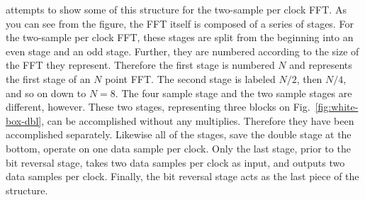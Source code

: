 \documentclass{gqtekspec}
\begin{document}
attempts to show some of this structure for the two-sample per clock FFT.
As you can see from the figure, the
FFT itself is composed of a series of stages.  For the two-sample per clock
FFT, these stages are split from the beginning into an even stage and an odd
stage.  Further, they are numbered
according to the size of the FFT they represent.  Therefore the first stage
is numbered $N$ and represents the first stage of an $N$ point FFT.  The
second stage is labeled $N/2$, then $N/4$, and so on down to $N=8$.  The
four sample stage and the two sample stages are different, however.  These
two stages, representing three blocks on Fig.~\ref{fig:white-box-dbl}, can be
accomplished without any multiplies.  Therefore they have been accomplished
separately.  Likewise all of the stages, save the double stage at the bottom,
operate on one data sample per clock.  Only the last stage, prior to the
bit reversal stage, takes two data samples per clock as input, and outputs two 
data samples per clock.  Finally, the bit reversal stage acts as the last
piece of the structure.
\end{document}
